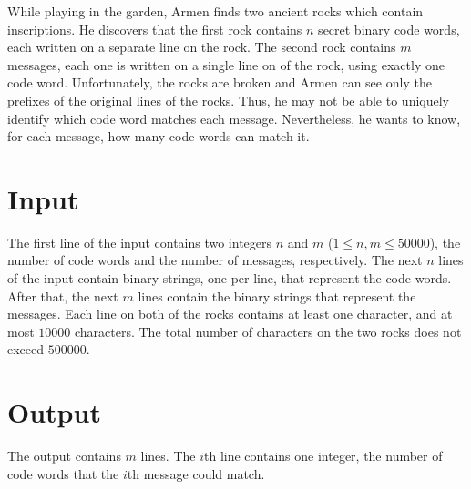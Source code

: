 
While playing in the garden, Armen finds two ancient rocks which contain inscriptions.
He discovers that the first rock contains $n$ secret binary code words, each written on a separate line on the rock.
The second rock contains $m$ messages, each one is written on a single line on of the rock, using exactly one code word.
Unfortunately, the rocks are broken and Armen can see only the prefixes of the original lines of the rocks.
Thus, he may not be able to uniquely identify which code word matches each message.
Nevertheless, he wants to know, for each message, how many code words can match it.

\section*{Input}
The first line of the input contains two integers $n$ and $m$ ($1 \leq n, m \leq 50000$), the number of code words and the number of messages, respectively.
The next $n$ lines of the input contain binary strings, one per line, that represent the code words.
After that, the next $m$ lines contain the binary strings that represent the messages.
Each line on both of the rocks contains at least one character, and at most $10000$ characters.
The total number of characters on the two rocks does not exceed $500000$.

\section*{Output}
The output contains $m$ lines.
The $i$th line contains one integer, the number of code words that the $i$th message could match.
